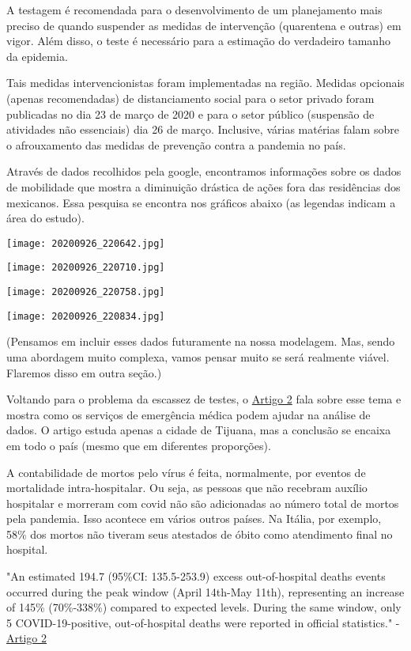 \documentclass{article}
\begin{document}
A testagem é recomendada para o desenvolvimento de um planejamento mais preciso de quando suspender as medidas de intervenção (quarentena e outras) em vigor. Além disso, o teste é necessário para a estimação do verdadeiro tamanho da epidemia. 

Tais medidas intervencionistas foram implementadas na região. Medidas opcionais (apenas recomendadas) de distanciamento social para o setor privado foram publicadas no dia 23 de março de 2020 e para o setor público (suspensão de atividades não essenciais) dia 26 de março. Inclusive, várias matérias falam sobre o afrouxamento das medidas de prevenção contra a pandemia no país. 

Através de dados recolhidos pela google, encontramos informações sobre os dados de mobilidade que mostra a diminuição drástica de ações fora das residências dos mexicanos. Essa pesquisa se encontra nos gráficos abaixo (as legendas indicam a área do estudo).

\texttt{[image: 20200926\_220642.jpg]}

\texttt{[image: 20200926\_220710.jpg]}

\texttt{[image: 20200926\_220758.jpg]}

\texttt{[image: 20200926\_220834.jpg]}

(Pensamos em incluir esses dados futuramente na nossa modelagem. Mas, sendo uma abordagem muito complexa, vamos pensar muito se será realmente viável. Flaremos disso em outra seção.)

Voltando para o problema da escassez de testes, o \href{https://www.sciencedirect.com/science/article/pii/S0196064420306016}{Artigo 2} fala sobre esse tema e mostra como os serviços de emergência médica podem ajudar na análise de dados. O artigo estuda apenas a cidade de Tijuana, mas a conclusão se encaixa em todo o país (mesmo que em diferentes proporções). 

A contabilidade de mortos pelo vírus é feita, normalmente, por eventos de mortalidade intra-hospitalar. Ou seja, as pessoas que não recebram auxílio hospitalar e morreram com covid não são adicionadas ao número total de mortos pela pandemia. Isso acontece em vários outros países. Na Itália, por exemplo, 58\% dos mortos não tiveram seus atestados de óbito como atendimento final no hospital.

\begin{center}
    "An estimated 194.7 (95\%CI: 135.5-253.9) excess out-of-hospital deaths events occurred during
the peak window (April 14th-May 11th), representing an increase of 145\% (70\%-338\%) compared to
expected levels. During the same window, only 5 COVID-19-positive, out-of-hospital deaths were
reported in official statistics." - \href{https://www.sciencedirect.com/science/article/pii/S0196064420306016}{Artigo 2}
\end{center}
\end{document}
